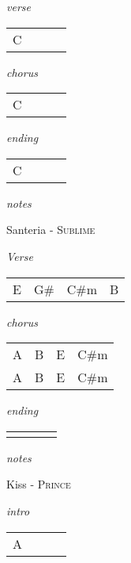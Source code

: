 \documentclass[12pt]{article}
\begin{document}
\textit{verse}

\begin{tabular}{|P{1.25in}|P{1.25in}|P{1.25in}|P{1.25in}|}
  C &   &   &   \\
\end{tabular}

\textit{chorus}

\begin{tabular}{|P{1.25in}|P{1.25in}|P{1.25in}|P{1.25in}|}
  C &   &   &   \\
\end{tabular}

\textit{ending}

\begin{tabular}{|P{1.25in}|P{1.25in}|P{1.25in}|P{1.25in}|}
  C &   &   &   \\
\end{tabular}

\textit{notes}

\newpage

{\Huge Santeria} {\huge - \textsc{Sublime}}

\huge
\textit{Verse}

\begin{tabular}{|P{1.25in}|P{1.25in}|P{1.25in}|P{1.25in}|}
  E & G\#  & C\#m  & B  \\
\end{tabular}

\textit{chorus}

\begin{tabular}{|P{1.25in}|P{1.25in}|P{1.25in}|P{1.25in}|}
  A &  B & E  &  C\#m \\
  A &  B & E  &  C\#m \\
  
\end{tabular}

\textit{ending}

\begin{tabular}{|P{1.25in}|P{1.25in}|P{1.25in}|P{1.25in}|}
    &    &   &   \\
\end{tabular}

\textit{notes}

\newpage

{\Huge Kiss} {\huge - \textsc{Prince}}

\huge
\textit{intro}

\begin{tabular}{|P{1.25in}|P{1.25in}|P{1.25in}|P{1.25in}|}
  A &   &   &   \\
\end{tabular}
\end{document}
